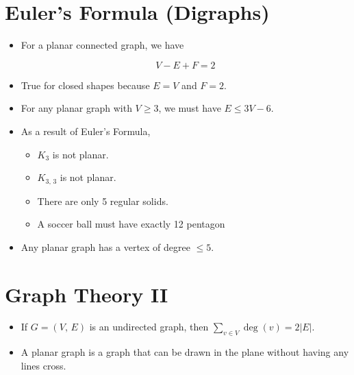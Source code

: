 \documentclass[12pt]{scrartcl}
\begin{document}
\section{Euler's Formula (Digraphs)}
\begin{itemize}
    \item For a planar connected graph, we have

        \begin{equation*}
            V - E + F = 2
        \end{equation*}

    \item True for closed shapes because $E = V$ and $F = 2$.
    \item For any planar graph with $V \geq 3$, we must have $E \leq 3V - 6$.
    \item As a result of Euler's Formula,
        \begin{itemize}
            \item $K_3$ is not planar.
            \item $K_{3,\, 3}$ is not planar.
            \item There are only 5 regular solids.
            \item A soccer ball must have exactly \num{12} pentagon
        \end{itemize}

    \item Any planar graph has a vertex of degree $\leq 5$.
\end{itemize}


\section{Graph Theory II}
\begin{itemize}
    \item If $G = (V,\, E)$ is an undirected graph, then $\sum _{v \in V} \deg(v) = 2|E|$.
    \item A planar graph is a graph that can be drawn in the plane without having any lines cross.
\end{itemize}
\end{document}
